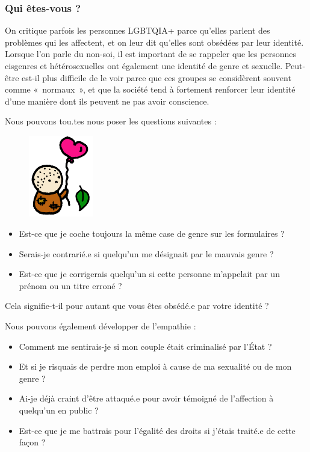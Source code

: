 \documentclass[12pt,openany]{book}
\begin{document}
\subsubsection*{Qui êtes-vous ?}

\noindent On critique parfois les personnes \mbox{LGBTQIA+} parce qu’elles parlent des problèmes qui les affectent, et on leur dit qu’elles sont obsédées par leur identité. Lorsque l’on parle du non-soi, il est important de se rappeler que les personnes cisgenres et hétérosexuelles ont également une identité de genre et sexuelle. Peut-être est-il plus difficile de le voir parce que ces groupes se considèrent souvent comme \mbox{« normaux »}, et que la société tend à fortement renforcer leur identité d’une manière dont ils peuvent ne pas avoir conscience.

Nous pouvons tou.tes nous poser les questions suivantes :
\begin{figure}
    \centering
    \includegraphics[width=0.25\textwidth]{33c.png}
\end{figure}
\begin{itemize}[label=\textbullet]
\setlength\itemsep{-0.3em}
\item Est-ce que je coche toujours la même case de genre sur les formulaires ?
\item Serais-je contrarié.e si quelqu’un me désignait par le mauvais genre ?
\item Est-ce que je corrigerais quelqu’un si cette personne m’appelait par un prénom ou un titre erroné ?
\end{itemize}

Cela signifie-t-il pour autant que vous êtes obsédé.e par votre identité ?

Nous pouvons également développer de l’empathie :

\begin{itemize}[label=\textbullet]
\setlength\itemsep{-0.3em}
\item Comment me sentirais-je si mon couple était criminalisé par l’État ?
\item Et si je risquais de perdre mon emploi à cause de ma sexualité ou de mon genre ?
\item Ai-je déjà craint d’être attaqué.e pour avoir témoigné de l’affection à quelqu’un en public ?
\item Est-ce que je me battrais pour l’égalité des droits si j’étais traité.e de cette façon ?
\end{itemize}
\end{document}

